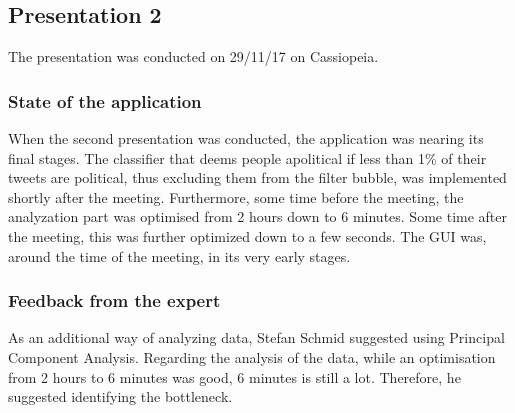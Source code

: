 \subsection{Presentation 2}
The presentation was conducted on 29/11/17 on Cassiopeia.

\subsubsection{State of the application}
When the second presentation was conducted, the application was nearing its
final stages. The classifier that deems people apolitical if less than 1\% of
their tweets are political, thus excluding them from the filter bubble, was
implemented shortly after the meeting. Furthermore, some time before the
meeting, the analyzation part was optimised from 2 hours down to 6 minutes. Some
time after the meeting, this was further optimized down to a few seconds. The
GUI was, around the time of the meeting, in its very early stages.

\subsubsection{Feedback from the expert}
As an additional way of analyzing data, Stefan Schmid suggested using Principal
Component Analysis. Regarding the analysis of the data, while an optimisation
from 2 hours to 6 minutes was good, 6 minutes is still a lot. Therefore, he
suggested identifying the bottleneck. 

